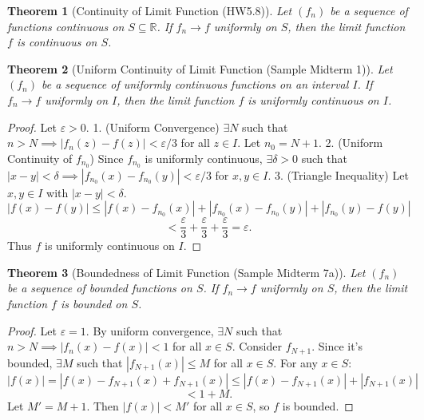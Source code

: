 \documentclass{article}
\theoremstyle{definition}
\theoremstyle{plain}
\newtheorem{theorem}{Theorem}[section]
\theoremstyle{remark}
\newcommand{\R}{\mathbb{R}}
\newcommand{\eps}{\varepsilon}
\begin{document}
\begin{theorem}[Continuity of Limit Function{\cite[Thm 24.3]{Ross}} (HW5.8)]
Let \((f_n)\) be a sequence of functions continuous on \(S \subseteq \R\). If \(f_n \to f\) uniformly on \(S\), then the limit function \(f\) is continuous on \(S\).
\end{theorem}

\begin{theorem}[Uniform Continuity of Limit Function (Sample Midterm 1)]
Let \((f_n)\) be a sequence of uniformly continuous functions on an interval \(I\). If \(f_n \to f\) uniformly on \(I\), then the limit function \(f\) is uniformly continuous on \(I\).
\end{theorem}
\begin{proof}
Let \(\eps > 0\).
1. (Uniform Convergence) \(\exists N\) such that \(n > N \implies |f_n(z) - f(z)| < \eps/3\) for all \(z \in I\). Let \(n_0 = N+1\).
2. (Uniform Continuity of \(f_{n_0}\)) Since \(f_{n_0}\) is uniformly continuous, \(\exists \delta > 0\) such that \(|x-y| < \delta \implies |f_{n_0}(x) - f_{n_0}(y)| < \eps/3\) for \(x, y \in I\).
3. (Triangle Inequality) Let \(x, y \in I\) with \(|x-y| < \delta\).
\[ |f(x)-f(y)| \le |f(x)-f_{n_0}(x)| + |f_{n_0}(x)-f_{n_0}(y)| + |f_{n_0}(y)-f(y)| \]
\[ < \frac{\eps}{3} + \frac{\eps}{3} + \frac{\eps}{3} = \eps. \]
Thus \(f\) is uniformly continuous on \(I\).
\end{proof}

\begin{theorem}[Boundedness of Limit Function{\cite[Ex 25.5]{Ross}} (Sample Midterm 7a)]
Let \((f_n)\) be a sequence of bounded functions on \(S\). If \(f_n \to f\) uniformly on \(S\), then the limit function \(f\) is bounded on \(S\).
\end{theorem}
\begin{proof}
Let \(\eps = 1\). By uniform convergence, \(\exists N\) such that \(n > N \implies |f_n(x) - f(x)| < 1\) for all \(x \in S\).
Consider \(f_{N+1}\). Since it's bounded, \(\exists M\) such that \(|f_{N+1}(x)| \le M\) for all \(x \in S\).
For any \(x \in S\):
\[ |f(x)| = |f(x) - f_{N+1}(x) + f_{N+1}(x)| \le |f(x) - f_{N+1}(x)| + |f_{N+1}(x)| \]
\[ < 1 + M. \]
Let \(M' = M+1\). Then \(|f(x)| < M'\) for all \(x \in S\), so \(f\) is bounded.
\end{proof}
\end{document}
